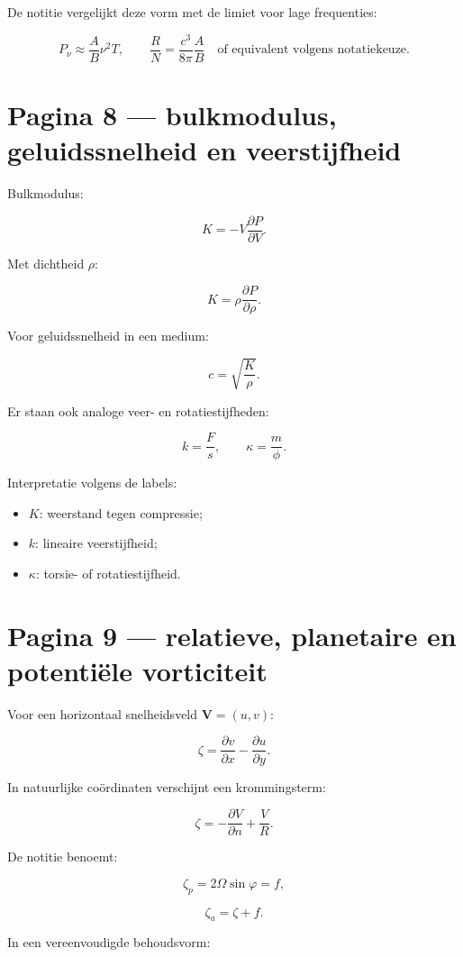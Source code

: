 \documentclass[11pt,a4paper]{article}
\newcommand{\vect}[1]{\mathbf{#1}}
\begin{document}
De notitie vergelijkt deze vorm met de limiet voor lage frequenties:

$$
P_\nu
\approx
\frac{A}{B}\nu^2 T,
\qquad
\frac{R}{N}
=
\frac{c^3}{8\pi}\frac{A}{B}
\quad
\text{of equivalent volgens notatiekeuze}.
$$

\newpage

\section*{Pagina 8 --- bulkmodulus, geluidssnelheid en veerstijfheid}
Bulkmodulus:

$$
K=-V\frac{\partial P}{\partial V}.
$$

Met dichtheid $\rho$:

$$
K=\rho\frac{\partial P}{\partial \rho}.
$$

Voor geluidssnelheid in een medium:

$$
c=\sqrt{\frac{K}{\rho}}.
$$

Er staan ook analoge veer- en rotatiestijfheden:

$$
k=\frac{F}{s},
\qquad
\kappa=\frac{m}{\phi}.
$$

Interpretatie volgens de labels:

\begin{itemize}
  \item $K$: weerstand tegen compressie;
  \item $k$: lineaire veerstijfheid;
  \item $\kappa$: torsie- of rotatiestijfheid.
\end{itemize}

\newpage

\section*{Pagina 9 --- relatieve, planetaire en potentiële vorticiteit}
Voor een horizontaal snelheidsveld $\vect{V}=(u,v)$:

$$
\zeta
=
\frac{\partial v}{\partial x}
-
\frac{\partial u}{\partial y}.
$$

In natuurlijke coördinaten verschijnt een krommingsterm:

$$
\zeta
=
-\frac{\partial V}{\partial n}
+
\frac{V}{R}.
$$

De notitie benoemt:

$$
\zeta_p
=
2\Omega\sin\varphi
=
f,
$$

$$
\zeta_a
=
\zeta+f.
$$

In een vereenvoudigde behoudsvorm:
\end{document}
